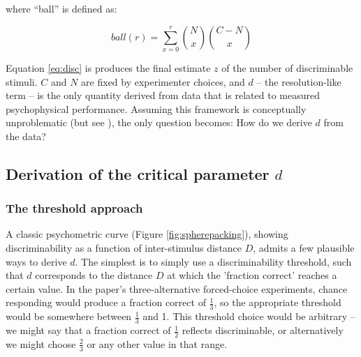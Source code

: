 \documentclass[letterpaper,twocolumn,10pt]{article}
\begin{document}
where ``ball'' is defined as: 

\begin{equation}
\label{eq:ball}
ball(r) = \sum_{x=0}^{r} \binom{N}{x}\binom{C-N}{x}
\end{equation} 

Equation \ref{eq:disc} is produces the final estimate $z$ of the number of discriminable stimuli. 
$C$ and $N$ are fixed by experimenter choices, 
and $d$ -- the resolution-like term -- is the only quantity derived from data that is related to measured psychophysical performance. 
Assuming this framework is conceptually unproblematic (but see \cite{meister_can_2014}), 
the only question becomes: How do we derive $d$ from the data? 

\subsection{Derivation of the critical parameter $d$} 
\label{sec:derivation}

\subsubsection{The threshold approach} 

A classic psychometric curve (Figure \ref{fig:spherepacking}), showing discriminability as a function of inter-stimulus distance $D$, admits a few plausible ways to derive $d$. 
The simplest is to simply use a discriminability threshold, such that $d$ corresponds to the distance $D$ at which the 'fraction correct' reaches a certain value.  
In the paper's three-alternative forced-choice experiments, chance responding would produce a fraction correct of $\frac{1}{3}$, 
so the appropriate threshold would be somewhere between $\frac{1}{3}$ and 1.  
This threshold choice would be arbitrary -- we might say that a fraction correct of $\frac{1}{2}$ reflects discriminable, 
or alternatively we might choose $\frac{2}{3}$ or any other value in that range.  
\end{document}
